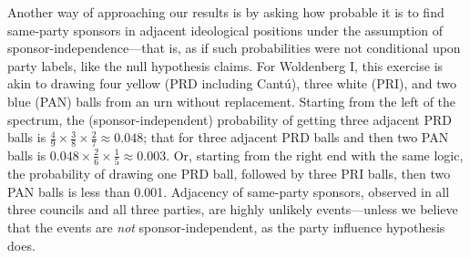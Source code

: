 \documentclass[12 pt, letter]{article}
\begin{document}
Another way of approaching our results is by asking how probable it
is to find same-party sponsors in adjacent ideological positions
under the assumption of sponsor-independence---that is, as if such
probabilities were not conditional upon party labels, like the null
hypothesis claims. For Woldenberg I, this exercise is akin to
drawing four yellow (PRD including Cant\'u), three white (PRI), and
two blue (PAN) balls from an urn without replacement. Starting from
the left of the spectrum, the (sponsor-independent) probability of
getting three adjacent PRD balls is $\frac{4}{9} \times \frac{3}{8}
\times \frac{2}{7} \approx 0.048$; that for three adjacent PRD balls
and then two PAN balls is $0.048 \times \frac{2}{6} \times
\frac{1}{5} \approx 0.003$. Or, starting from the right end with the
same logic, the probability of drawing one PRD ball, followed by
three PRI balls, then two PAN balls is less than 0.001. Adjacency of
same-party sponsors, observed in all three councils and all three
parties, are highly unlikely events---unless we believe that the
events are \emph{not} sponsor-independent, as the party influence
hypothesis does.
\end{document}
